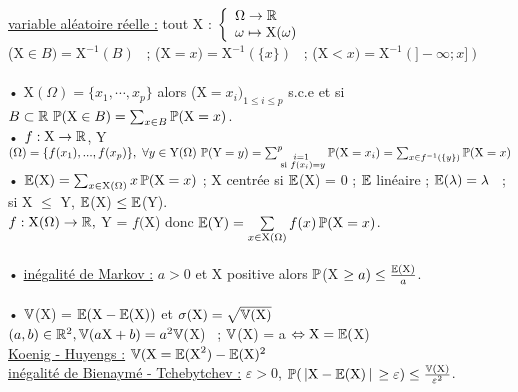 \documentclass[12 pt]{book}
\begin{document}
\begin{flushleft}
\begin{doublespace}

	\underline{variable aléatoire réelle :} tout X : $\left\{\begin{array}{ll} \Omega \rightarrow \mathbb{R} \\ \omega \mapsto \text{X}(\omega) \end{array} \right.$\\
	(X$\in B ) = \text{X}^{-1}(B)$ \ ; (X$ = x) = \text{X}^{- 1}(\{x\})$ \ ; (X$ < x) = \text{X}^{- 1} (] - \infty ; x])$\\
	\text{ }\\
	• X$(\Omega) = \{ x_1,\cdots, x_p\}$ alors (X$ = x_i)_{1\leq i \leq p}$ s.c.e et si $B\subset \mathbb{R} \ \mathbb{P}(\text{X}\in B) = \sum_{x\in B} \mathbb{P}(\text{X} = x)$.\\
	• $f : \text{X} \rightarrow \mathbb{R}$, Y$(\Omega) = \{ f(x_1),..., f(x_p)\}, \ \forall y\in \text{Y}(\Omega) \ \mathbb{P}(\text{Y} = y) = \sum_{\begin{subarray}{l} \text{\quad \  \ } i = 1 \\ \text{ si } f(x_i) =y \end{subarray}}^p \mathbb{P}(\text{X} = x_i) = \sum_{x\in f^{- 1}(\{y\})} \mathbb{P}(\text{X} = x)$\\
	• $\mathbb{E}(\text{X}) = \sum_{x\in \text{X}(\Omega)} x \, \mathbb{P}(\text{X} = x)$ ; X centrée si $\mathbb{E}$(X) = 0 ; $\mathbb{E}$ linéaire ; $\mathbb{E}(\lambda) = \lambda$ \ ; si X $\leq$ Y, $\mathbb{E}$(X) $\leq \mathbb{E}$(Y).\\
	$f : \text{X}(\Omega) \rightarrow \mathbb{R},$ Y = $f($X) donc $\mathbb{E}(\text{Y}) = \sum\limits_{x\in \text{X}(\Omega)} f(x) \, \mathbb{P}(\text{X} = x)$.\\
	
	\text{ }\\
	• \underline{inégalité de Markov :} $a>0$ et X positive alors $\mathbb{P}$(X $\geq a) \leq \frac{\mathbb{E}(\text{X})}{a}$.\\
	
	\text{ }\\
	• $\mathbb{V}$(X) = $\mathbb{E} \text{(X} - \mathbb{E}(\text{X}))$ et $\sigma(\text{X}) = \sqrt{\mathbb{V}(\text{X})}$\\
	$(a,b)\in\mathbb{R}^2, \mathbb{V}(a\text{X} +  b) = a^2 \mathbb{V}($X) \ ; $\mathbb{V}$(X) = a $\Leftrightarrow \text{X} = \mathbb{E}($X) \\ \underline{Koenig - Huyengs :} $\mathbb{V}(\text{X} = \mathbb{E}(\text{X}^2) - \mathbb{E}(\text{X})^2$ \\
	\underline{inégalité de Bienaymé - Tchebytchev :} $\varepsilon > 0$, $\mathbb{P}(\, |\text{X} -\mathbb{E}(\text{X}) \, | \, \geq \varepsilon) \leq \frac{\mathbb{V}(\text{X})}{\varepsilon^2}$.\\
	

\end{doublespace}
\end{flushleft}
\end{document}
